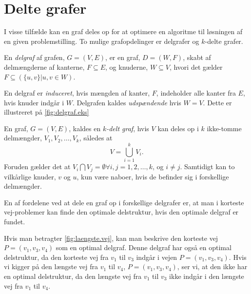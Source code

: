 \section{Delte grafer}
I visse tilfælde kan en graf deles op for at optimere en algoritme til løsningen af en given problemstilling.
To mulige grafopdelinger er delgrafer og $k$-delte grafer.

\begin{defn}[Delgraf] \label{defn:delgraf} %
En \emph{delgraf} af grafen, $G= (V,E)$, er en graf, $D = (W,F)$, skabt af delmængderne af kanterne, $F \subseteq E$, og knuderne, $W \subseteq V$, hvori det gælder $F \subseteq (\{u,v\} | u,v \in W)$.
\end{defn}

En delgraf er \emph{induceret}, hvis mængden af kanter, $F$, indeholder alle kanter fra $E$, hvis knuder indgår i $W$.
Delgrafen kaldes \emph{udspændende} hvis $W=V$. Dette er illustreret på \autoref{fig:delgraf.eks}



\begin{defn} \label{defn:k-delt} %
En graf, $G = (V, E)$, kaldes en \emph{$k$-delt graf}, hvis $V$ kan deles op i $k$ ikke-tomme delmængder, $V_1, V_2,\dotsc, V_k$, således at 
\begin{equation}
V = \bigcup_{i=1}^{k} V_i. 
\end{equation}
Foruden gælder det at $V_i \bigcap V_j  = \emptyset \forall i,j=1, 2, \dotsc, k$, og $i\neq j$. Samtidigt kan to vilkårlige knuder, $v$ og $u$, kun være naboer, hvis de befinder sig i forskellige delmængder. 
\end{defn}


En af fordelene ved at dele en graf op i forskellige delgrafer er, at man i korteste vej-problemer kan finde den optimale delstruktur, hvis den optimale delgraf er fundet. 

Hvis man betragter \autoref{fig:laengste.vej}, kan man beskrive den korteste vej $P=(v_1,v_3,v_4)$ som en optimal delgraf. Denne delgraf har også en optimal delstruktur, da den korteste vej fra $v_1$ til $v_3$ indgår i vejen $P=(v_1,v_3,v_4)$.
Hvis vi kigger på den længste vej fra $v_1$ til $v_4$, $P=(v_1,v_3,v_4)$, ser vi, at den ikke har en optimal delstruktur, da den længste vej fra $v_1$ til $v_3$ ikke indgår i den længste vej fra $v_1$ til $v_4$.








